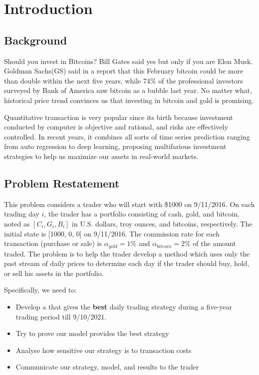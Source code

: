 \documentclass{mcmthesis}
\begin{document}
\maketitle

\tableofcontents
\newpage    %
\section{Introduction}
\subsection{Background }
Should you invest in Bitcoins? Bill Gates said yes but only if you are Elon Musk. Goldman Sachs(GS) said in a report that this February bitcoin could be more than double within the next five years, while 74\% of the professional investors surveyed by Bank of America saw bitcoin as a bubble last year. No matter what, historical price trend convinces us that investing in bitcoin and gold is promising.


Quantitative transaction is very popular since its birth because investment conducted by computer is objective and rational, and risks are effectively controlled. In recent years, it combines all sorts of time series prediction ranging from auto regression to deep learning, proposing multifarious investment strategies to help us maximize our assets in real-world markets.

\subsection{Problem Restatement}


This problem considers a trader who will start with \$1000 on 9/11/2016. On each trading day $i$, the trader has a portfolio consisting of cash, gold, and bitcoin, noted as $[C_i, G_i, B_i]$  in U.S. dollars, troy ounces, and bitcoins, respectively. The initial state is [1000, 0, 0] on 9/11/2016. The commission rate for each transaction (purchase or sale) is $\alpha_{gold} = 1\%$  and  $\alpha_{bitcoin} = 2\%$ of the amount traded. The problem is to help the trader develop a method which uses only the past stream of daily prices to determine each day if the trader should buy, hold, or sell his assets in the portfolio.


Specifically,  we need to:
\begin{itemize}
    \item Develop a that gives the \textbf{best} daily trading strategy during a five-year trading period till 9/10/2021.
    \item Try to prove our model provides the best strategy
    \item Analyse how sensitive our strategy is to transaction costs
    \item Communicate our strategy, model, and results to the trader
\end{itemize}
\end{document}
